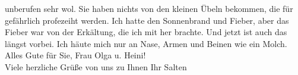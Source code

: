 \begin{ledgroupsized}[t]{13cm}
               unberufen sehr wol. Sie haben nichts von den kleinen Übeln bekommen, die für
               gefährlich profezeiht werden. Ich hatte den Sonnenbrand und Fieber, aber das Fieber
               war von der Erkältung, die ich mit her brachte. Und jetzt ist auch das längst vorbei.
               Ich häute mich nur an Nase, Armen und Beinen wie ein Molch. Alles Gute für Sie, Frau
                  Olga u. Heini! {\\}Viele herzliche Grüße von uns zu Ihnen\pend
           \pstart Ihr \spacefill\mbox{Salten}\pend{}
         
         \endnumbering{}\end{ledgroupsized}\begin{anhang}\end{anhang}\newcommand{\dateiname}{L03501}\newcommand{\titel}{Felix Salten an Arthur Schnitzler, 29. 6. 1909}\newcommand{\editorInnen}{Martin Anton Müller und Laura Untner}
      